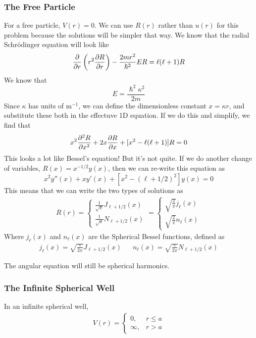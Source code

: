\documentclass[a4paper]{article}
\begin{document}
\subsubsection{The Free Particle}
For a free particle, $V(r)=0$. We can use $R(r)$ rather than $u(r)$ for this
problem because the solutions will be simpler that way. We know that the
radial Schr\"odinger equation will look like
\[
	\pd{r}\left(r^2\pder{R}{r}\right)-\frac{2mr^2}{\hslash^2}ER
	= \ell(\ell+1)R
\]
We know that \[E=\frac{\hslash^2\kappa^2}{2m}\]
Since $\kappa$ has units of m$^{-1}$, we can define the dimensionless constant
$x=\kappa r$, and substitute these both in the effectuve 1D equation. If we
do this and simplify, we find that
\[
	x^2\frac{\partial ^2R}{\partial x^2}+2x\frac{\partial R}{\partial x}+[x^2-\ell(\ell+1)]R=0
\]
This looks a lot like Bessel's equation! But it's not quite. If we do another
change of variables, $R(x) = x^{-1/2}y(x)$, then we can re-write this equation
as
\[ x^2y''(x)+xy'(x)+[x^2-(\ell+1/2)^2]y(x)=0\]
This means that we can write the two types of solutions as
\begin{align*}
	R(r) = 
	\begin{cases}
		\frac{1}{\sqrt{x}}J_{\ell+1/2}(x)\\
		\frac{1}{\sqrt{x}}N_{\ell+1/2}(x)
	\end{cases}
	=
	\begin{cases}
		\sqrt{\frac{2}{\pi}}j_{\ell}(x)\\
		\sqrt{\frac{2}{\pi}}n_{\ell}(x)
	\end{cases}
\end{align*}
Where $j_{\ell}(x)$ and $n_{\ell}(x)$ are the Spherical Bessel functions,
defined as
\begin{align*}
	j_{\ell}(x) = \sqrt{\frac{\pi}{2x}}J_{\ell+1/2}(x) &&
	n_{\ell}(x) = \sqrt{\frac{\pi}{2x}}N_{\ell+1/2}(x)
\end{align*}

The angular equation will still be spherical harmonics.

\subsubsection{The Infinite Spherical Well}
In an infinite spherical well,
\begin{align*}
	V(r) = 
\begin{cases}
	0, & r\leq a\\
	\infty, & r>a
\end{cases}
\end{align*}
\end{document}
